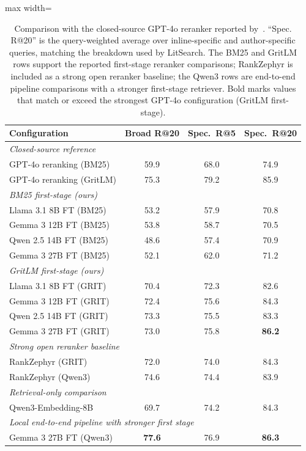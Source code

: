 \documentclass[pdflatex,sn-basic,Numbered]{sn-jnl}%
\theoremstyle{thmstyleone}%
\theoremstyle{thmstyletwo}%
\theoremstyle{thmstylethree}%
\begin{document}
\begin{table}[ht]


\centering
\renewcommand{\arraystretch}{1.1}
\setlength{\tabcolsep}{4pt}
\footnotesize
\begin{adjustbox}{max width=\linewidth}
\begin{tabular}{l c c c}
\hline
Configuration & Broad R@20 & Spec.\ R@5 & Spec.\ R@20 \\
\hline
\multicolumn{4}{l}{\textit{Closed-source reference~\cite{Ajith}}} \\
GPT-4o reranking (BM25)        & 59.9 & 68.0 & 74.9 \\
GPT-4o reranking (GritLM)      & 75.3 & 79.2 & 85.9 \\
\hline
\multicolumn{4}{l}{\textit{BM25 first-stage (ours)}} \\
Llama 3.1 8B FT (BM25)         & 53.2 & 57.9 & 70.8 \\
Gemma 3 12B FT (BM25)          & 53.8 & 58.7 & 70.5 \\
Qwen 2.5 14B FT (BM25)         & 48.6 & 57.4 & 70.9 \\
Gemma 3 27B FT (BM25)          & 52.1 & 62.0 & 71.2 \\
\hline
\multicolumn{4}{l}{\textit{GritLM first-stage (ours)}} \\
Llama 3.1 8B FT (GRIT)     & 70.4 & 72.3 & 82.6 \\
Gemma 3 12B FT (GRIT)      & 72.4 & 75.6 & 84.3 \\
Qwen 2.5 14B FT (GRIT)     & 73.3 & 75.5 & 83.3 \\
Gemma 3 27B FT (GRIT)      & 73.0 & 75.8 & \textbf{86.2} \\
\hline
\multicolumn{4}{l}{\textit{Strong open reranker baseline}} \\
RankZephyr (GRIT)          & 72.0 & 74.0 & 84.3 \\
RankZephyr (Qwen3)         & 74.6 & 74.4 & 83.9 \\
\hline
\multicolumn{4}{l}{\textit{Retrieval-only comparison}} \\
Qwen3-Embedding-8B & 69.7 & 74.2 & 84.3 \\
\hline
\multicolumn{4}{l}{\textit{Local end-to-end pipeline with stronger first stage}} \\
Gemma 3 27B FT (Qwen3)     & \textbf{77.6} & 76.9 & \textbf{86.3} \\
\hline
\end{tabular}
\end{adjustbox}



\caption{ Comparison with the closed-source GPT-4o reranker reported by~\cite{Ajith}. ``Spec. R@20'' is the query-weighted average
over inline-specific and author-specific queries, matching the breakdown used by LitSearch. The BM25 and GritLM rows
support the reported first-stage reranker comparisons; RankZephyr is included as a strong open reranker baseline; the Qwen3 rows
are end-to-end pipeline comparisons with a stronger first-stage retriever. Bold marks values that match or exceed the strongest
GPT-4o configuration (GritLM first-stage).}
\label{tab:gpt4o}
\end{table}
\end{document}
